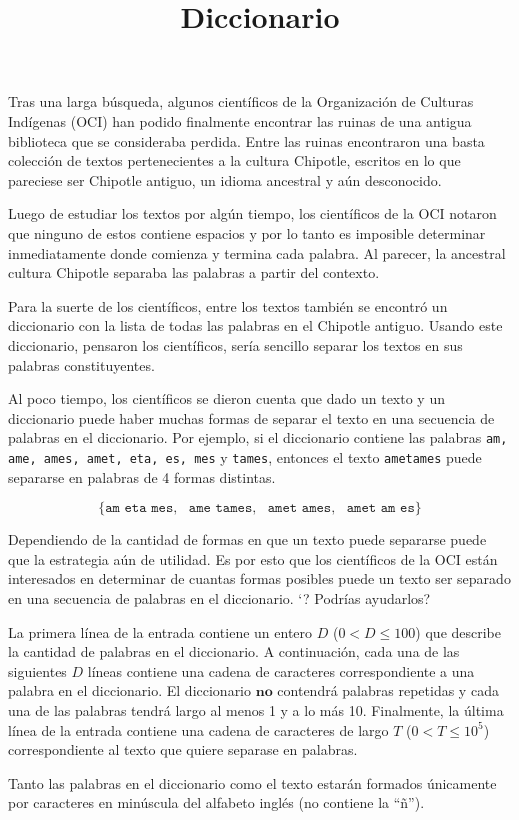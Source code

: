 \documentclass{oci}
\title{Diccionario}
\begin{document}
\begin{problemDescription}
Tras una larga búsqueda, algunos científicos de la Organización de Culturas
Indígenas (OCI) han podido finalmente encontrar las ruinas de una antigua
biblioteca que se consideraba perdida.
Entre las ruinas encontraron una basta colección de textos pertenecientes a la
cultura Chipotle, escritos en lo que pareciese ser Chipotle antiguo, un idioma
ancestral y aún desconocido.

Luego de estudiar los textos por algún tiempo, los científicos de la OCI notaron
que ninguno de estos contiene espacios y por lo tanto es imposible determinar
inmediatamente donde comienza y termina cada palabra.
Al parecer, la ancestral cultura Chipotle separaba las palabras a partir del
contexto.

Para la suerte de los científicos, entre los textos también se encontró un
diccionario con la lista de todas las palabras en el Chipotle antiguo.
Usando este diccionario, pensaron los científicos, sería sencillo separar los
textos en sus palabras constituyentes.

Al poco tiempo, los científicos se dieron cuenta que dado un texto y un
diccionario puede haber muchas formas de separar el texto en una secuencia de
palabras en el diccionario.
Por ejemplo, si el diccionario contiene las palabras \texttt{am, ame, ames,
  amet, eta, es, mes} y  \texttt{tames}, entonces el texto \texttt{ametames}
puede separarse en palabras de 4 formas distintas.

$$\{\texttt{am eta mes},\ \ \  \texttt{ame tames},\ \ \  \texttt{amet ames},\ \ \  \texttt{amet am es}  \}$$


Dependiendo de la cantidad de formas en que un texto puede separarse puede que
la estrategia aún de utilidad.
Es por esto que los científicos de la OCI están interesados en determinar de
cuantas formas posibles puede un texto ser separado en una secuencia de palabras
en el diccionario.
`? Podrías ayudarlos?
\end{problemDescription}

\begin{inputDescription}
  La primera línea de la entrada contiene un entero $D$ ($0 < D \leq 100$) que
  describe la cantidad de palabras en el diccionario.
  A continuación, cada una de las siguientes $D$ líneas contiene una cadena de
  caracteres correspondiente a una palabra en el diccionario.
  El diccionario $\textbf{no}$ contendrá palabras repetidas y cada una de las
  palabras tendrá largo al menos 1 y a lo más 10.
  Finalmente, la última línea de la entrada contiene una cadena de caracteres de
  largo $T$ ($0 < T \leq 10^5$) correspondiente al texto que quiere separase en palabras.

  Tanto las palabras en el diccionario como el texto estarán formados
  únicamente por caracteres en minúscula del alfabeto inglés (no contiene la ``ñ'').
\end{inputDescription}
\end{document}
